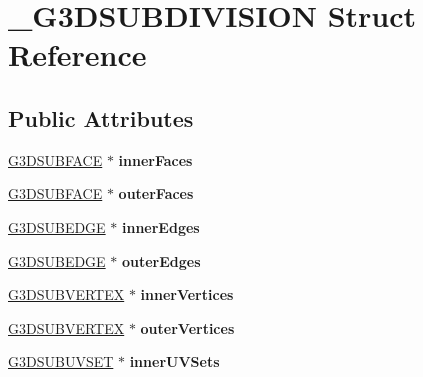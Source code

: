 \hypertarget{struct__G3DSUBDIVISION}{}\section{\+\_\+\+G3\+D\+S\+U\+B\+D\+I\+V\+I\+S\+I\+ON Struct Reference}
\label{struct__G3DSUBDIVISION}
\subsection*{Public Attributes}
\begin{DoxyCompactItemize}
\item 
\mbox{\label{struct__G3DSUBDIVISION_a2c9661ccd09099ea6910c9f0e4310520}} 
\hyperlink{struct__G3DSUBFACE}{G3\+D\+S\+U\+B\+F\+A\+CE} $\ast$ {\bfseries inner\+Faces}
\item 
\mbox{\label{struct__G3DSUBDIVISION_a6b3cc69119b08d70ce2881db8207b9ee}} 
\hyperlink{struct__G3DSUBFACE}{G3\+D\+S\+U\+B\+F\+A\+CE} $\ast$ {\bfseries outer\+Faces}
\item 
\mbox{\label{struct__G3DSUBDIVISION_ab5d449c2606d0e7f053ba7f560c76f80}} 
\hyperlink{struct__G3DSUBEDGE}{G3\+D\+S\+U\+B\+E\+D\+GE} $\ast$ {\bfseries inner\+Edges}
\item 
\mbox{\label{struct__G3DSUBDIVISION_a9944abfbd92e982a22106f3c44f73fa4}} 
\hyperlink{struct__G3DSUBEDGE}{G3\+D\+S\+U\+B\+E\+D\+GE} $\ast$ {\bfseries outer\+Edges}
\item 
\mbox{\label{struct__G3DSUBDIVISION_aece4cfa639e8b99226c1f070e5deb78b}} 
\hyperlink{struct__G3DINNERVERTEX}{G3\+D\+S\+U\+B\+V\+E\+R\+T\+EX} $\ast$ {\bfseries inner\+Vertices}
\item 
\mbox{\label{struct__G3DSUBDIVISION_a1512fabe71dca9eb8a14caecb0aba17c}} 
\hyperlink{struct__G3DINNERVERTEX}{G3\+D\+S\+U\+B\+V\+E\+R\+T\+EX} $\ast$ {\bfseries outer\+Vertices}
\item 
\mbox{\label{struct__G3DSUBDIVISION_ac38d496d2e161ad2fb9ed7dbb670fea5}} 
\hyperlink{struct__G3DUVSET}{G3\+D\+S\+U\+B\+U\+V\+S\+ET} $\ast$ {\bfseries inner\+U\+V\+Sets}

\end{DoxyCompactItemize}
